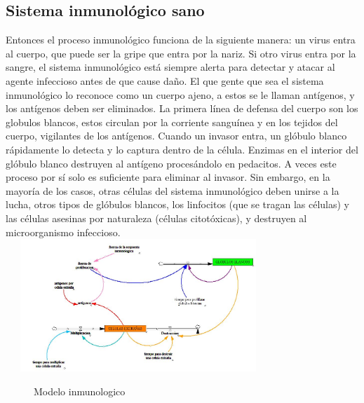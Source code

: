 \documentclass[12pt,letterpaper]{article}
\begin{document}
\subsection{Sistema inmunológico sano}

Entonces el proceso inmunológico funciona de la siguiente manera: un virus entra al cuerpo, que puede ser la gripe que entra por la nariz. Si otro virus entra por la sangre, el sistema inmunológico está siempre alerta para detectar y atacar al agente infeccioso antes de que cause daño. El que gente que sea el sistema inmunológico lo reconoce como un cuerpo ajeno, a estos se le llaman antígenos, y los antígenos deben ser eliminados.
La primera línea de defensa del cuerpo son los globulos blancos, estos circulan por la corriente sanguínea y en los tejidos del cuerpo, vigilantes de los antígenos.
Cuando un invasor entra, un glóbulo blanco rápidamente lo detecta y lo captura dentro de la célula. Enzimas en el interior del glóbulo blanco destruyen al antígeno procesándolo en pedacitos. A veces este proceso por sí solo es suficiente para eliminar al invasor. Sin embargo, en la mayoría de los casos, otras células del sistema inmunológico deben unirse a la lucha, otros tipos de glóbulos blancos, los linfocitos (que se tragan las células) y las células asesinas por naturaleza (células citotóxicas), y destruyen al microorganismo infeccioso.\\
\includegraphics[width=10cm, height=5cm]{3.JPG}
\begin{figure}
\centering

\caption{\label{fig:3 } Modelo inmunologico}
\end{figure}
\\
\end{document}
